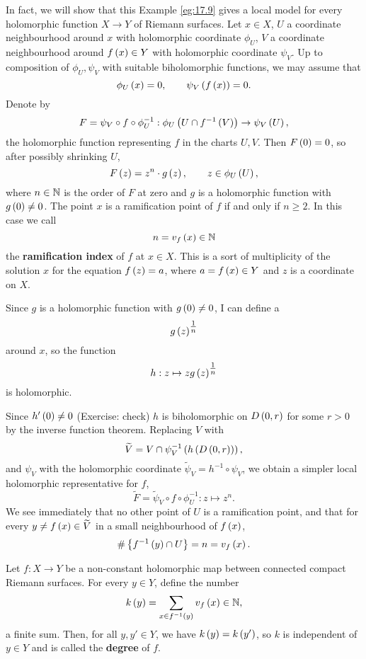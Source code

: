 In fact, we will show that this Example \ref{eg:17.9} gives a local model for every holomorphic function $ X \to Y $ of Riemann surfaces. Let $ x \in X $, $ U $ a coordinate neighbourhood around $ x $ with holomorphic coordinate $ \phi_U $, $ V $ a coordinate neighbourhood around $ f\left( x \right) \in Y $ with holomorphic coordinate $ \psi_V $. Up to composition of $ \phi_U, \psi_V $ with suitable biholomorphic functions, we may assume that
$$ \phi_U\left( x \right) = 0, \qquad \psi_V\left( f\left( x \right) \right) = 0. $$
Denote by
$$ F = \psi_V \circ f \circ \phi_U^{-1} : \phi_U\left( U \cap f^{-1}\left( V \right) \right) \to \psi_V\left( U \right), $$
the holomorphic function representing $ f $ in the charts $ U, V $. Then $ F\left( 0 \right) = 0 $, so after possibly shrinking $ U $,
$$ F\left( z \right) = z^n \cdot g\left( z \right), \qquad z \in \phi_U\left( U \right), $$
where $ n \in \mathbb{N} $ is the order of $ F $ at zero and $ g $ is a holomorphic function with $ g\left( 0 \right) \ne 0 $. The point $ x $ is a ramification point of $ f $ if and only if $ n \ge 2 $. In this case we call
$$ n = v_f\left( x \right) \in \mathbb{N} $$
the \textbf{ramification index} of $ f $ at $ x \in X $. This is a sort of multiplicity of the solution $ x $ for the equation $ f\left( z \right) = a $, where $ a = f\left( x \right) \in Y $ and $ z $ is a coordinate on $ X $.

\begin{note*}
Since $ g $ is a holomorphic function with $ g\left( 0 \right) \ne 0 $, I can define a
$$ g\left( z \right)^{\tfrac{1}{n}} $$
around $ x $, so the function
$$ h : z \mapsto zg\left( z \right)^{\tfrac{1}{n}} $$
is holomorphic.
\end{note*}

Since $ h'\left( 0 \right) \ne 0 $ (Exercise: check) $ h $ is biholomorphic on $ D\left( 0, r \right) $ for some $ r > 0 $ by the inverse function theorem. Replacing $ V $ with
$$ \widetilde{V} = V \cap \psi_V^{-1}\left( h\left( D\left( 0, r \right) \right) \right), $$
and $ \psi_V $ with the holomorphic coordinate $ \widetilde{\psi}_V = h^{-1} \circ \psi_V $, we obtain a simpler local holomorphic representative for $ f $,
$$ \widetilde{F} = \widetilde{\psi}_V \circ f \circ \phi_U^{-1} : z \mapsto z^n. $$
We see immediately that no other point of $ U $ is a ramification point, and that for every $ y \ne f\left( x \right) \in \widetilde{V} $ in a small neighbourhood of $ f\left( x \right) $,
$$ \#\left\{ f^{-1}\left( y \right) \cap U \right\} = n = v_f\left( x \right). $$

\pagebreak

\begin{lemma}
Let $ f : X \to Y $ be a non-constant holomorphic map between connected compact Riemann surfaces. For every $ y \in Y $, define the number
$$ k\left( y \right) = \sum_{x \in f^{-1}\left( y \right)} v_f\left( x \right) \in \mathbb{N}, $$
a finite sum. Then, for all $ y, y' \in Y $, we have $ k\left( y \right) = k\left( y' \right) $, so $ k $ is independent of $ y \in Y $ and is called the \textbf{degree} of $ f $.
\end{lemma}

